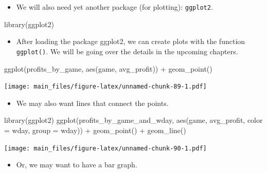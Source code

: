 \documentclass[
]{book}
\newenvironment{Shaded}{\begin{snugshade}}{\end{snugshade}}
\newcommand{\AttributeTok}[1]{\textcolor[rgb]{0.77,0.63,0.00}{#1}}
\newcommand{\FunctionTok}[1]{\textcolor[rgb]{0.00,0.00,0.00}{#1}}
\newcommand{\NormalTok}[1]{#1}
\newcommand{\SpecialCharTok}[1]{\textcolor[rgb]{0.00,0.00,0.00}{#1}}
\providecommand{\tightlist}{%
  \setlength{\itemsep}{0pt}\setlength{\parskip}{0pt}}
\begin{document}
\begin{itemize}
\tightlist
\item
  We will also need yet another package (for plotting): \texttt{ggplot2}.
\end{itemize}

\begin{Shaded}
\begin{Highlighting}[]
\FunctionTok{library}\NormalTok{(ggplot2)}
\end{Highlighting}
\end{Shaded}

\begin{itemize}
\tightlist
\item
  After loading the package ggplot2, we can create plots with the function \texttt{ggplot()}. We will be going over the details in the upcoming chapters.
\end{itemize}

\begin{Shaded}
\begin{Highlighting}[]
\FunctionTok{ggplot}\NormalTok{(profits\_by\_game, }\FunctionTok{aes}\NormalTok{(game, avg\_profit)) }\SpecialCharTok{+} \FunctionTok{geom\_point}\NormalTok{()}
\end{Highlighting}
\end{Shaded}

\texttt{[image: main\_files/figure-latex/unnamed-chunk-89-1.pdf]}

\begin{itemize}
\tightlist
\item
  We may also want lines that connect the points.
\end{itemize}

\begin{Shaded}
\begin{Highlighting}[]
\FunctionTok{library}\NormalTok{(ggplot2)}
\FunctionTok{ggplot}\NormalTok{(profits\_by\_game\_and\_wday, }\FunctionTok{aes}\NormalTok{(game, avg\_profit, }\AttributeTok{color =}\NormalTok{ wday, }\AttributeTok{group =}\NormalTok{ wday)) }\SpecialCharTok{+} \FunctionTok{geom\_point}\NormalTok{() }\SpecialCharTok{+} \FunctionTok{geom\_line}\NormalTok{()}
\end{Highlighting}
\end{Shaded}

\texttt{[image: main\_files/figure-latex/unnamed-chunk-90-1.pdf]}

\begin{itemize}
\tightlist
\item
  Or, we may want to have a bar graph.
\end{itemize}
\end{document}
